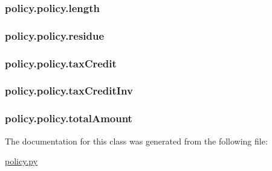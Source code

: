 \hypertarget{classpolicy_1_1policy_af00e78989c7d2828e7b4229e39843ca0}{
\subsubsection[{length}]{\setlength{\rightskip}{0pt plus 5cm}policy.\-policy.\-length}}\label{classpolicy_1_1policy_af00e78989c7d2828e7b4229e39843ca0}
\hypertarget{classpolicy_1_1policy_ab78d71bff388654cfacb959bfe5cef03}{
\subsubsection[{residue}]{\setlength{\rightskip}{0pt plus 5cm}policy.\-policy.\-residue}}\label{classpolicy_1_1policy_ab78d71bff388654cfacb959bfe5cef03}
\hypertarget{classpolicy_1_1policy_a9f59d3ac957bef82d164303b9af656d1}{
\subsubsection[{tax\-Credit}]{\setlength{\rightskip}{0pt plus 5cm}policy.\-policy.\-tax\-Credit}}\label{classpolicy_1_1policy_a9f59d3ac957bef82d164303b9af656d1}
\hypertarget{classpolicy_1_1policy_a90637806ccf81726d7f5084b0b63e44e}{
\subsubsection[{tax\-Credit\-Inv}]{\setlength{\rightskip}{0pt plus 5cm}policy.\-policy.\-tax\-Credit\-Inv}}\label{classpolicy_1_1policy_a90637806ccf81726d7f5084b0b63e44e}
\hypertarget{classpolicy_1_1policy_ae7122c03e70428c903fd13f713b0b2a9}{
\subsubsection[{total\-Amount}]{\setlength{\rightskip}{0pt plus 5cm}policy.\-policy.\-total\-Amount}}\label{classpolicy_1_1policy_ae7122c03e70428c903fd13f713b0b2a9}


The documentation for this class was generated from the following file\-:\begin{DoxyCompactItemize}
\item 
\hyperlink{policy_8py}{policy.\-py}\end{DoxyCompactItemize}

